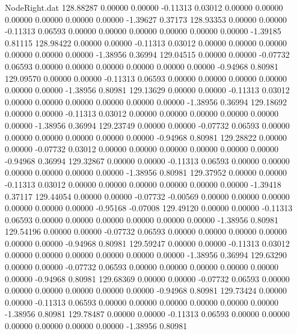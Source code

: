 \begin{filecontents}{NodeRight.dat}
 128.88287    0.00000    0.00000    -0.11313    0.03012    0.00000    0.00000    0.00000    0.00000    0.00000    0.00000   -1.39627    0.37173
 128.93353    0.00000    0.00000    -0.11313    0.06593    0.00000    0.00000    0.00000    0.00000    0.00000    0.00000   -1.39185    0.81115
 128.98422    0.00000    0.00000    -0.11313    0.03012    0.00000    0.00000    0.00000    0.00000    0.00000    0.00000   -1.38956    0.36994
 129.04515    0.00000    0.00000    -0.07732    0.06593    0.00000    0.00000    0.00000    0.00000    0.00000    0.00000   -0.94968    0.80981
 129.09570    0.00000    0.00000    -0.11313    0.06593    0.00000    0.00000    0.00000    0.00000    0.00000    0.00000   -1.38956    0.80981
 129.13629    0.00000    0.00000    -0.11313    0.03012    0.00000    0.00000    0.00000    0.00000    0.00000    0.00000   -1.38956    0.36994
 129.18692    0.00000    0.00000    -0.11313    0.03012    0.00000    0.00000    0.00000    0.00000    0.00000    0.00000   -1.38956    0.36994
 129.23749    0.00000    0.00000    -0.07732    0.06593    0.00000    0.00000    0.00000    0.00000    0.00000    0.00000   -0.94968    0.80981
 129.28822    0.00000    0.00000    -0.07732    0.03012    0.00000    0.00000    0.00000    0.00000    0.00000    0.00000   -0.94968    0.36994
 129.32867    0.00000    0.00000    -0.11313    0.06593    0.00000    0.00000    0.00000    0.00000    0.00000    0.00000   -1.38956    0.80981
 129.37952    0.00000    0.00000    -0.11313    0.03012    0.00000    0.00000    0.00000    0.00000    0.00000    0.00000   -1.39418    0.37117
 129.44054    0.00000    0.00000    -0.07732   -0.00569    0.00000    0.00000    0.00000    0.00000    0.00000    0.00000   -0.95168   -0.07008
 129.49120    0.00000    0.00000    -0.11313    0.06593    0.00000    0.00000    0.00000    0.00000    0.00000    0.00000   -1.38956    0.80981
 129.54196    0.00000    0.00000    -0.07732    0.06593    0.00000    0.00000    0.00000    0.00000    0.00000    0.00000   -0.94968    0.80981
 129.59247    0.00000    0.00000    -0.11313    0.03012    0.00000    0.00000    0.00000    0.00000    0.00000    0.00000   -1.38956    0.36994
 129.63290    0.00000    0.00000    -0.07732    0.06593    0.00000    0.00000    0.00000    0.00000    0.00000    0.00000   -0.94968    0.80981
 129.68369    0.00000    0.00000    -0.07732    0.06593    0.00000    0.00000    0.00000    0.00000    0.00000    0.00000   -0.94968    0.80981
 129.73424    0.00000    0.00000    -0.11313    0.06593    0.00000    0.00000    0.00000    0.00000    0.00000    0.00000   -1.38956    0.80981
 129.78487    0.00000    0.00000    -0.11313    0.06593    0.00000    0.00000    0.00000    0.00000    0.00000    0.00000   -1.38956    0.80981

\end{filecontents}
